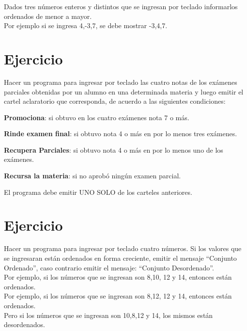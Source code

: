\documentclass[12pt,a4paper,twoside]{article}
\begin{document}
\hspace*{1cm}Dados tres números enteros y distintos que se ingresan por teclado informarlos ordenados de menor a mayor.\\
Por ejemplo si se ingresa 4,-3,7, se debe mostrar -3,4,7.

\newpage

\section{Ejercicio }

\hspace*{1cm}Hacer un programa para ingresar por teclado las cuatro notas de los exámenes parciales obtenidas por un alumno en una determinada materia y luego emitir el cartel aclaratorio que corresponda, de acuerdo a las siguientes condiciones:
\begin{list}{•}{}
\item \textbf{Promociona}: si obtuvo en los cuatro exámenes nota 7 o más.
\item \textbf{Rinde examen final}: si obtuvo nota 4 o más en por lo menos tres exámenes.
\item \textbf{Recupera Parciales}: si obtuvo nota 4 o más en por lo menos uno de los exámenes.
\item \textbf{Recursa la materia}: si no aprobó ningún examen parcial.
\end{list}
El programa debe emitir UNO SOLO de los carteles anteriores.

\newpage

\section{Ejercicio }

\hspace*{1cm}Hacer un programa para ingresar por teclado cuatro números. Si los valores que se ingresaran están ordenados en forma creciente, emitir el mensaje “Conjunto Ordenado”, caso contrario emitir el mensaje: “Conjunto Desordenado”.\\
Por ejemplo, si los números que se ingresan son 8,10, 12 y 14, entonces están ordenados.\\
Por ejemplo, si los números que se ingresan son 8,12, 12 y 14, entonces están ordenados.\\
Pero si los números que se ingresan son 10,8,12 y 14, los mismos están desordenados.\\
\end{document}
